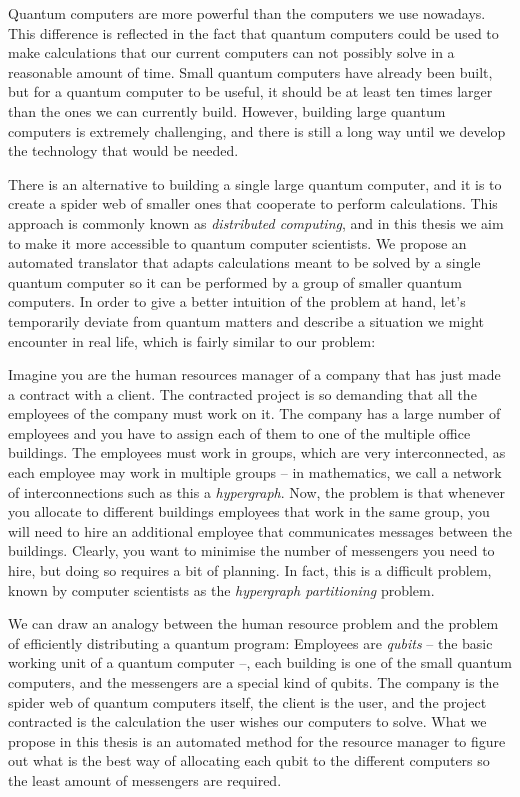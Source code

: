 Quantum computers are more powerful than the computers we use nowadays. This difference is reflected in the fact that quantum computers could be used to make calculations that our current computers can not possibly solve in a reasonable amount of time. Small quantum computers have already been built, but for a quantum computer to be useful, it should be at least ten times larger than the ones we can currently build. However, building large quantum computers is extremely challenging, and there is still a long way until we develop the technology that would be needed.

There is an alternative to building a single large quantum computer, and it is to create a spider web of smaller ones that cooperate to perform calculations. This approach is commonly known as \textit{distributed computing}, and in this thesis we aim to make it more accessible to quantum computer scientists. We propose an automated translator that adapts calculations meant to be solved by a single quantum computer so it can be performed by a group of smaller quantum computers. In order to give a better intuition of the problem at hand, let's temporarily deviate from quantum matters and describe a situation we might encounter in real life, which is fairly similar to our problem: 

Imagine you are the human resources manager of a company that has just made a contract with a client. The contracted project is so demanding that all the employees of the company must work on it. The company has a large number of employees and you have to assign each of them to one of the multiple office buildings. The employees must work in groups, which are very interconnected, as each employee may work in multiple groups -- in mathematics, we call a network of interconnections such as this a \textit{hypergraph}. Now, the problem is that whenever you allocate to different buildings employees that work in the same group, you will need to hire an additional employee that communicates messages between the buildings. Clearly, you want to minimise the number of messengers you need to hire, but doing so requires a bit of planning. In fact, this is a difficult problem, known by computer scientists as the \textit{hypergraph partitioning} problem.

We can draw an analogy between the human resource problem and the problem of efficiently distributing a quantum program: Employees are \textit{qubits} -- the basic working unit of a quantum computer --, each building is one of the small quantum computers, and the messengers are a special kind of qubits. The company is the spider web of quantum computers itself, the client is the user, and the project contracted is the calculation the user wishes our computers to solve. What we propose in this thesis is an automated method for the resource manager to figure out what is the best way of allocating each qubit to the different computers so the least amount of messengers are required.


